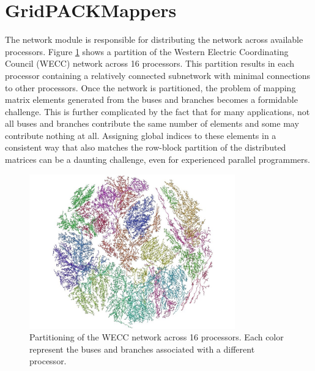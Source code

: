 \documentclass[preprint]{acm_proc_article-sp}
\begin{document}
\section{GridPACK\texttrademark Mappers}
The network module is responsible for distributing the network across available
processors. Figure \ref{wecc} shows a partition of the Western Electric
Coordinating Council (WECC) network across 16 processors. This partition results
in each processor containing a relatively connected subnetwork with minimal
connections to other processors. Once the network is partitioned, the
problem of mapping matrix elements generated from the buses and branches becomes
a formidable challenge. This is further complicated by the fact that for many
applications, not all buses and branches contribute the same number of elements
and some may contribute nothing at all. Assigning global indices to these
elements in a consistent way that also matches the row-block partition of the
distributed matrices can be a daunting challenge, even for experienced parallel
programmers.
\begin{figure}
\centering
\includegraphics[width=3.5in,keepaspectratio=true]{./Fig3}
\caption{\label{wecc} Partitioning of the WECC network across 16 processors. Each
color represent the buses and branches associated with a different processor.
}
\end{figure}
\end{document}
